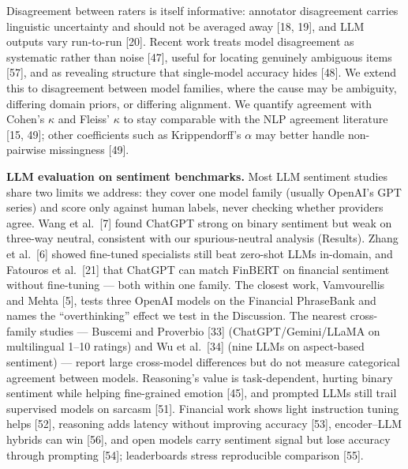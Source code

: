 \documentclass[11pt]{article}
\begin{document}
Disagreement between raters is itself informative: annotator
disagreement carries linguistic uncertainty and should not be averaged
away {[}18, 19{]}, and LLM outputs vary run-to-run {[}20{]}. Recent work
treats model disagreement as systematic rather than noise {[}47{]},
useful for locating genuinely ambiguous items {[}57{]}, and as revealing
structure that single-model accuracy hides {[}48{]}. We extend this to
disagreement between model families, where the cause may be ambiguity,
differing domain priors, or differing alignment. We quantify agreement
with Cohen's $\kappa$ and Fleiss' $\kappa$ to stay comparable with the NLP agreement
literature {[}15, 49{]}; other coefficients such as Krippendorff's $\alpha$ may
better handle non-pairwise missingness {[}49{]}.

\textbf{LLM evaluation on sentiment benchmarks.} Most LLM sentiment
studies share two limits we address: they cover one model family
(usually OpenAI's GPT series) and score only against human labels, never
checking whether providers agree. Wang et al.~{[}7{]} found ChatGPT
strong on binary sentiment but weak on three-way neutral, consistent
with our spurious-neutral analysis (Results). Zhang et al.~{[}6{]}
showed fine-tuned specialists still beat zero-shot LLMs in-domain, and
Fatouros et al.~{[}21{]} that ChatGPT can match FinBERT on financial
sentiment without fine-tuning --- both within one family. The closest
work, Vamvourellis and Mehta {[}5{]}, tests three OpenAI models on the
Financial PhraseBank and names the ``overthinking'' effect we test in
the Discussion. The nearest cross-family studies --- Buscemi and
Proverbio {[}33{]} (ChatGPT/Gemini/LLaMA on multilingual 1--10 ratings)
and Wu et al.~{[}34{]} (nine LLMs on aspect-based sentiment) --- report
large cross-model differences but do not measure categorical agreement
between models. Reasoning's value is task-dependent, hurting binary
sentiment while helping fine-grained emotion {[}45{]}, and prompted LLMs
still trail supervised models on sarcasm {[}51{]}. Financial work shows
light instruction tuning helps {[}52{]}, reasoning adds latency without
improving accuracy {[}53{]}, encoder--LLM hybrids can win {[}56{]}, and
open models carry sentiment signal but lose accuracy through prompting
{[}54{]}; leaderboards stress reproducible comparison {[}55{]}.
\end{document}
